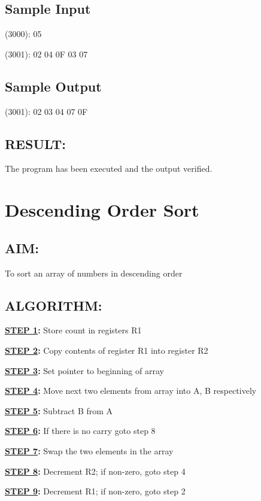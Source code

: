 \documentclass[a4paper,28pt]{report}
\begin{document}
\section*{Sample Input}
(3000): 05

(3001): 02
 04
 0F
 03
 07

\section*{Sample Output}
(3001): 02 
 03 
 04
 07
 0F

\section*{RESULT:}
The program has been executed and the output verified.
%
%
\chapter{Descending Order Sort}
%
%
\section*{AIM:}
To sort an array of numbers in descending order

\section*{ALGORITHM:}
\textbf{\underline{STEP 1}:} Store count in registers R1

\textbf{\underline{STEP 2}:} Copy contents of register R1 into register R2

\textbf{\underline{STEP 3}:} Set pointer to beginning of array 

\textbf{\underline{STEP 4}:} Move next two elements from array into A, B respectively

\textbf{\underline{STEP 5}:} Subtract B from A

\textbf{\underline{STEP 6}:} If there is no carry goto step 8

\textbf{\underline{STEP 7}:} Swap the two elements in the array

\textbf{\underline{STEP 8}:} Decrement R2; if non-zero, goto step 4

\textbf{\underline{STEP 9}:} Decrement R1; if non-zero, goto step 2  
\end{document}
